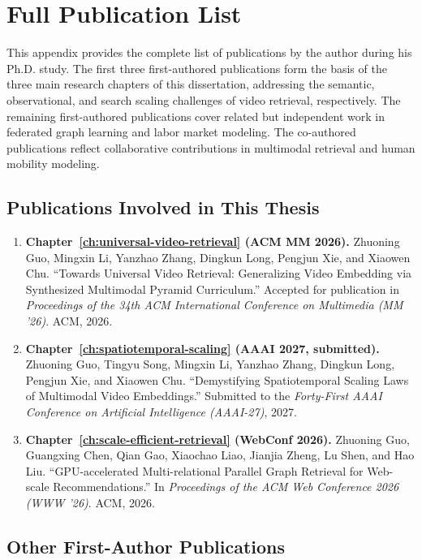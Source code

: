 \chapter{Full Publication List}
\label{ch:publications}

This appendix provides the complete list of publications by the author during his Ph.D. study. The first three first-authored publications form the basis of the three main research chapters of this dissertation, addressing the semantic, observational, and search scaling challenges of video retrieval, respectively. The remaining first-authored publications cover related but independent work in federated graph learning and labor market modeling. The co-authored publications reflect collaborative contributions in multimodal retrieval and human mobility modeling.

\section*{Publications Involved in This Thesis}

\begin{enumerate}
    \item \textbf{Chapter~\ref{ch:universal-video-retrieval} (ACM MM 2026).} Zhuoning Guo, Mingxin Li, Yanzhao Zhang, Dingkun Long, Pengjun Xie, and Xiaowen Chu. ``Towards Universal Video Retrieval: Generalizing Video Embedding via Synthesized Multimodal Pyramid Curriculum.'' Accepted for publication in \emph{Proceedings of the 34th ACM International Conference on Multimedia (MM '26)}. ACM, 2026.

    \item \textbf{Chapter~\ref{ch:spatiotemporal-scaling} (AAAI 2027, submitted).} Zhuoning Guo, Tingyu Song, Mingxin Li, Yanzhao Zhang, Dingkun Long, Pengjun Xie, and Xiaowen Chu. ``Demystifying Spatiotemporal Scaling Laws of Multimodal Video Embeddings.'' Submitted to the \emph{Forty-First AAAI Conference on Artificial Intelligence (AAAI-27)}, 2027.

    \item \textbf{Chapter~\ref{ch:scale-efficient-retrieval} (WebConf 2026).} Zhuoning Guo, Guangxing Chen, Qian Gao, Xiaochao Liao, Jianjia Zheng, Lu Shen, and Hao Liu. ``GPU-accelerated Multi-relational Parallel Graph Retrieval for Web-scale Recommendations.'' In \emph{Proceedings of the ACM Web Conference 2026 (WWW '26)}. ACM, 2026.
\end{enumerate}

\section*{Other First-Author Publications}

